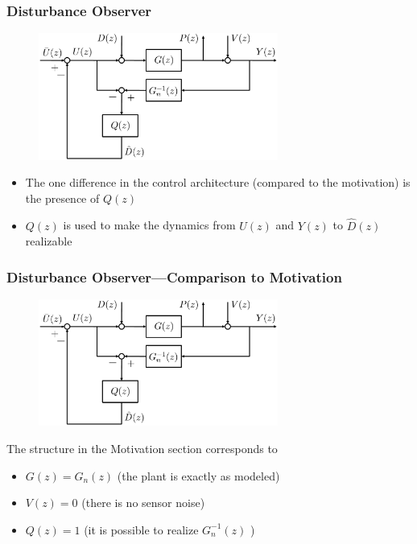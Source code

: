 \begin{frame}
    \frametitle{Disturbance Observer}

    \begin{figure}
        \includegraphics[width=0.7\textwidth]{Disturbance_Observer_DO}\\
    \end{figure}

    \begin{itemize}
    \item
    The one difference in the control architecture (compared to the motivation) is the presence of $Q(z)$

    \item
    $Q(z)$ is used to make the dynamics from $U(z)$ and $Y(z)$ to $\hat{D}(z)$ realizable
    \end{itemize}
\end{frame}

\begin{frame}
    \frametitle{Disturbance Observer---Comparison to Motivation}

    \begin{figure}
        \includegraphics[width=0.7\textwidth]{Disturbance_Observer_DO}\\
    \end{figure}

    The structure in the Motivation section corresponds to
    \begin{itemize}
    \item
    $G(z) = G_n(z)$ (the plant is exactly as modeled)
    \pause

    \item
    $V(z) = 0$ (there is no sensor noise)
    \pause

    \item
    $Q(z) = 1$ (it is possible to realize $G_n^{-1}(z)$ )

    \end{itemize}
\end{frame}


